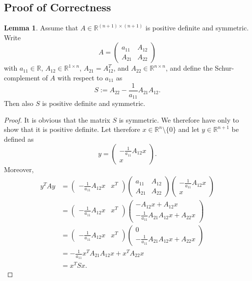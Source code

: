 \documentclass[11pt]{article}
\theoremstyle{definition}
\newtheorem{lemma}{Lemma}[section]
\begin{document}
\subsection{Proof of Correctness}

\begin{lemma}
Assume that $A\in\mathbb{R}^{(n+1)\times (n+1)}$ is positive definite and symmetric.
Write
\begin{equation*}
A=\begin{pmatrix}
a_{11} & A_{12} \\
A_{21} & A_{22}
\end{pmatrix}
\end{equation*}
with $a_{11}\in\mathbb{R}$, $A_{12}\in\mathbb{R}^{1\times n}$, $A_{21}=A_{12}^T$, and $A_{22}\in\mathbb{R}^{n\times n}$, and define the Schur-complement of $A$ with respect to $a_{11}$ as
\begin{equation*}
S:=A_{22}-\frac{1}{a_{11}}A_{21}A_{12}.
\end{equation*}
Then also $S$ is positive definite and symmetric.
\end{lemma}

\begin{proof}
It is obvious that the matrix $S$ is symmetric. We therefore have only to show that it is positive definite. Let therefore $x\in\mathbb{R}^n\setminus\{0\}$ and let $y\in\mathbb{R}^{n+1}$ be defined as 
\begin{equation*}
y=\begin{pmatrix}
-\frac{1}{a_{11}}A_{12}x \\
x
\end{pmatrix}.
\end{equation*}
Moreover,
\begin{align*}
y^TAy&=
\begin{pmatrix}
-\frac{1}{a_{11}}A_{12}x & x^T
\end{pmatrix}
\begin{pmatrix}
a_{11} & A_{12} \\
A_{21} & A_{22}
\end{pmatrix}
\begin{pmatrix}
-\frac{1}{a_{11}}A_{12}x \\
x
\end{pmatrix} \\
&=
\begin{pmatrix}
-\frac{1}{a_{11}}A_{12}x & x^T
\end{pmatrix}
\begin{pmatrix}
-A_{12}x+A_{12}x \\
-\frac{1}{a_{11}}A_{21}A_{12}x+A_{22}x
\end{pmatrix} \\
&=
\begin{pmatrix}
-\frac{1}{a_{11}}A_{12}x & x^T
\end{pmatrix}
\begin{pmatrix}
0 \\
-\frac{1}{a_{11}}A_{21}A_{12}x+A_{22}x
\end{pmatrix} \\
&=-\frac{1}{a_{11}}x^TA_{21}A_{12}x+x^TA_{22}x \\
&=x^TSx.
\end{align*}
\end{proof}
\end{document}
